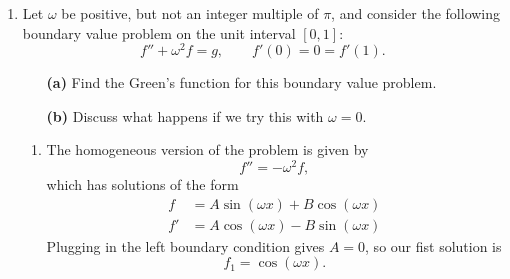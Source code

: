 \documentclass[10pt,letterpaper]{report}
\begin{document}
\begin{enumerate}
\item \begin{qbox}
Let $\omega$ be positive, but not an integer multiple of $\pi$, and consider the following boundary value problem on the unit interval $[0, 1]:$
\[
f'' + \omega^2 f = g, \qquad f'(0) = 0 = f'(1).
\]
\begin{itemize}
    \item[\textbf{(a)}] Find the Green's function for this boundary value problem.
    \item[\textbf{(b)}] Discuss what happens if we try this with $\omega = 0$.
\end{itemize}
\end{qbox}
\begin{enumerate}
    \item The homogeneous version of the problem is given by
    \[
    f'' = -\omega^2 f,
    \]
    which has solutions of the form 
    \begin{align*}
    f &= A \sin(\omega x) + B\cos(\omega x)
    \\
    f' &= A \cos(\omega x) - B\sin(\omega x)
    \end{align*}
    Plugging in the left boundary condition gives $A = 0$, so our fist solution is
    \[
    f_1 = \cos(\omega x).
    \]
    

\end{enumerate}
\end{enumerate}
\end{document}
